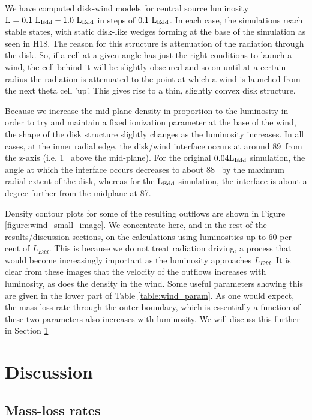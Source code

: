\documentclass[a4paper,fleqn,usenatbib]{mnras}
\begin{document}
We have computed disk-wind models for central source luminosity 
$\rm{L=0.1~L_{Edd}-1.0~L_{Edd}}$ in steps of $\rm{0.1~L_{Edd}}$. In each case, the simulations reach stable states, 
with static disk-like wedges forming at the base of the simulation as seen in H18. The reason for this
structure is attenuation of the radiation through the disk. So, if a cell at a given angle has just the right
conditions to launch a wind, the cell behind it will be slightly obscured and so on until at a certain radius
the radiation is attenuated to the point at which a wind is launched from the next theta cell 'up'. This gives
rise to a thin, slightly convex disk structure. 

Because we increase the mid-plane density in proportion to the luminosity in order to try and maintain 
a fixed ionization parameter at the base of the wind, the shape of the disk structure slightly changes as
the luminosity increases. In all cases, at the inner radial edge, the disk/wind interface occurs at 
around 89\degree~from the z-axis (i.e. 1\degree~ above the mid-plane). For the original $\rm{0.04L_{Edd}}$ 
simulation, the angle at which the interface occurs decreases to about 88\degree~ by the maximum radial
extent of the disk, whereas for the $\rm{L_{Edd}}$ simulation, the interface is about a degree further from the
midplane at 87\degree.

Density contour plots for some of the resulting outflows are shown in Figure \ref{figure:wind_small_image}.
We concentrate here, and in the rest of the results/discussion sections, on the calculations using luminosities
up to 60 per cent of $L_{Edd}$. This is because we do not treat radiation driving, a process
that would become increasingly important as the luminosity approaches $L_{Edd}$.
It is clear from these images that the velocity of the outflows increases with luminosity, as does the 
density in the wind. Some useful parameters showing this are given in the lower part of Table \ref{table:wind_param}.
As one would expect, the mass-loss rate through the outer boundary, which is essentially a function of these 
two parameters also increases with luminosity. We will discuss this further in Section \ref{section:discussion}




\section{Discussion}
\label{section:discussion}


\subsection{Mass-loss rates}
\end{document}
